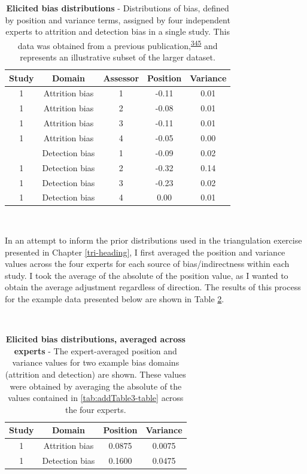\documentclass[a4paper, twoside]{templates/ociamthesis}
\begin{document}
\begin{table}[H]

\caption[Elicited bias distributions]{\label{tab:addTable1-table}\textbf{Elicited bias distributions} - Distributions of bias, defined by position and variance terms, assigned by four independent experts to attrition and detection bias in a single study. This data was obtained from a previous publication,\textsuperscript{\protect\hyperlink{ref-turner2009}{345}} and represents an illustrative subset of the larger dataset.}
\centering
\begin{tabular}[t]{ccccc}
\toprule
\textbf{Study} & \textbf{Domain} & \textbf{Assessor} & \textbf{Position} & \textbf{Variance}\\
\midrule
1 & Attrition bias & 1 & -0.11 & 0.01\\
1 & Attrition bias & 2 & -0.08 & 0.01\\
1 & Attrition bias & 3 & -0.11 & 0.01\\
1 & Attrition bias & 4 & -0.05 & 0.00\\
\addlinespace
1 & Detection bias & 1 & -0.09 & 0.02\\
1 & Detection bias & 2 & -0.32 & 0.14\\
1 & Detection bias & 3 & -0.23 & 0.02\\
1 & Detection bias & 4 & 0.00 & 0.01\\
\bottomrule
\end{tabular}
\end{table}

~

In an attempt to inform the prior distributions used in the triangulation exercise presented in Chapter \ref{tri-heading}, I first averaged the position and variance values across the four experts for each source of bias/indirectness within each study. I took the average of the absolute of the position value, as I wanted to obtain the average adjustment regardless of direction. The results of this process for the example data presented below are shown in Table \ref{tab:addTable2-table}.

~\\




\begin{table}[H]

\caption[Expert-elicited bias distributions, averaged across experts]{\label{tab:addTable2-table}\textbf{Elicited bias distributions, averaged across experts} - The expert-averaged position and variance values for two example bias domains (attrition and detection) are shown. These values were obtained by averaging the absolute of the values contained in \ref{tab:addTable3-table} across the four experts.}
\centering
\begin{tabular}[t]{cccc}
\toprule
\textbf{Study} & \textbf{Domain} & \textbf{Position} & \textbf{Variance}\\
\midrule
1 & Attrition bias & 0.0875 & 0.0075\\
1 & Detection bias & 0.1600 & 0.0475\\
\bottomrule
\end{tabular}
\end{table}
\end{document}
